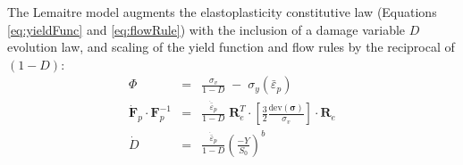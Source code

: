\documentclass[sn-mathphys,Numbered,draft]{sn-jnl}%
\begin{document}

The Lemaitre model augments the elastoplasticity constitutive law (Equations \ref{eq:yieldFunc} and \ref{eq:flowRule}) with the inclusion of a damage variable $D$ evolution law, and scaling of the yield function and flow rules by the reciprocal of $(1 - D)$:
 \begin{eqnarray} \label{eq:lemaitre_dp}
	 \Phi &=& \frac{\sigma_v}{1 - D} \; - \; \sigma_y\left(\bar{\varepsilon}_p \right) \\
    \dot{\mathbf{F}}_p \cdot \mathbf{F}_p^{-1}
    &=&
    \frac{\dot{\bar{\varepsilon}}_p}{1 - D} \; \mathbf{R}_e^T \cdot 
    \left[
    \frac{3}{2} \frac{\text{dev}\left(\boldsymbol{\sigma} \right)} {\sigma_{v}}
    \right]
    \cdot  \mathbf{R}_e \\
    \dot{D} &=&
    \frac{\dot{\bar{\varepsilon}}_p}{1 - D}\left(\frac{-Y}{S_0}\right)^b \label{eq:lem_damage}
\end{eqnarray}
\end{document}
